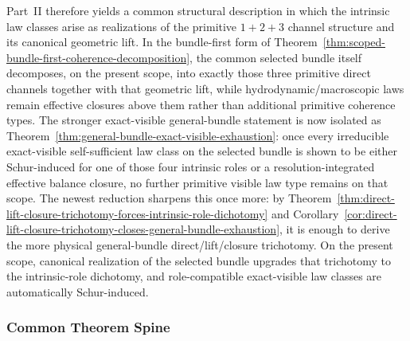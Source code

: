 Part~II therefore yields a common structural description in which the intrinsic
law classes arise as realizations of the primitive \(1+2+3\) channel
structure and its canonical geometric lift. In the bundle-first form of
Theorem~\ref{thm:scoped-bundle-first-coherence-decomposition}, the common
selected bundle itself decomposes, on the present scope, into exactly
those three primitive direct channels together with that geometric lift, while
hydrodynamic/macroscopic laws remain effective closures above them rather than
additional primitive coherence types. The stronger
exact-visible general-bundle statement is now isolated as
Theorem~\ref{thm:general-bundle-exact-visible-exhaustion}: once every
irreducible exact-visible self-sufficient law class on the selected bundle is
shown to be either Schur-induced for one of those four intrinsic roles or a
resolution-integrated effective balance closure, no further primitive visible
law type remains on that scope. The newest reduction sharpens this once
more: by
Theorem~\ref{thm:direct-lift-closure-trichotomy-forces-intrinsic-role-dichotomy}
and
Corollary~\ref{cor:direct-lift-closure-trichotomy-closes-general-bundle-exhaustion},
it is enough to derive the more physical general-bundle direct/lift/closure
trichotomy. On the present scope, canonical realization of the
selected bundle upgrades that trichotomy to the intrinsic-role dichotomy, and
role-compatible exact-visible law classes are automatically Schur-induced.

\subsubsection{Common Theorem Spine}

